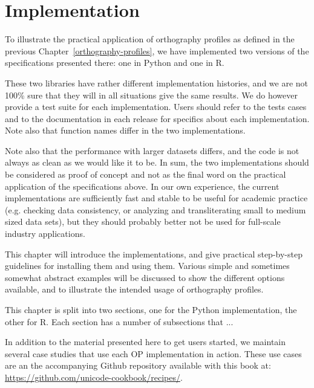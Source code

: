 \chapter{Implementation}
\label{implementation}

To illustrate the practical application of orthography profiles as defined in
the previous Chapter~\ref{orthography-profiles}, we have implemented two 
versions of the specifications presented there: one in Python and one
in R.

These two libraries have rather different implementation histories,
and we are not 100\% sure that they will in all situations give the same
results. We do however provide a test suite for each implementation. 
Users should refer to the tests cases and to the documentation in each release 
for specifics about each implementation. Note also that function names differ 
in the two implementations.

Note also that the performance with larger datasets differs, and the code is not
always as clean as we would like it to be. In sum, the two implementations
should be considered as proof of concept and not as the final word on the
practical application of the specifications above. In our own experience, the
current implementations are sufficiently fast and stable to be useful for
academic practice (e.g. checking data consistency, or analyzing and
transliterating small to medium sized data sets), but they should probably
better not be used for full-scale industry applications.

This chapter will introduce the implementations, and give practical step-by-step 
guidelines for installing them and using them. Various simple and sometimes 
somewhat abstract examples will be discussed to show the different options 
available, and to illustrate the intended usage of orthography profiles. 

This chapter is split into two sections, one for the Python implementation, the 
other for R. Each section has a number of subsections that ...

In addition to the material presented here to get users started, we maintain 
several case studies that use each OP implementation in action. These use cases 
are an the accompanying Github repository available with this book at: 
\url{https://github.com/unicode-cookbook/recipes/}.



